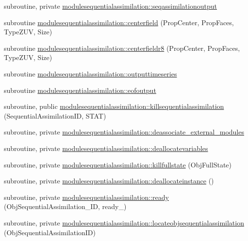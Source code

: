 \begin{DoxyCompactItemize}
subroutine, private \mbox{\hyperlink{namespacemodulesequentialassimilation_a80cfe86b207ec25cc26de13d8bad205c}{modulesequentialassimilation\+::seqassimilationoutput}}
\item 
subroutine \mbox{\hyperlink{namespacemodulesequentialassimilation_a2481d2ea20d9e305e0090e324dd3893e}{modulesequentialassimilation\+::centerfield}} (Prop\+Center, Prop\+Faces, Type\+Z\+UV, Size)
\item 
subroutine \mbox{\hyperlink{namespacemodulesequentialassimilation_aa1246853229add1c591a38826af67ea2}{modulesequentialassimilation\+::centerfieldr8}} (Prop\+Center, Prop\+Faces, Type\+Z\+UV, Size)
\item 
subroutine \mbox{\hyperlink{namespacemodulesequentialassimilation_a484eaebcabbe127119b8f5623e94c654}{modulesequentialassimilation\+::outputtimeseries}}
\item 
subroutine \mbox{\hyperlink{namespacemodulesequentialassimilation_a4f7834d6d8d5c26c37c74e758a14b521}{modulesequentialassimilation\+::eofoutput}}
\item 
subroutine, public \mbox{\hyperlink{namespacemodulesequentialassimilation_a50ed5db30b7f431f2b333f7f86d5ef99}{modulesequentialassimilation\+::killsequentialassimilation}} (Sequential\+Assimilation\+ID, S\+T\+AT)
\item 
subroutine, private \mbox{\hyperlink{namespacemodulesequentialassimilation_adf87f0a5e3f8680e6eab41ee6c53dd51}{modulesequentialassimilation\+::deassociate\+\_\+external\+\_\+modules}}
\item 
subroutine, private \mbox{\hyperlink{namespacemodulesequentialassimilation_aa604c23d9d9ee0bb814f499c565fde3f}{modulesequentialassimilation\+::deallocatevariables}}
\item 
subroutine, private \mbox{\hyperlink{namespacemodulesequentialassimilation_a7077ed60ddc61ad6d71f0df6d63bd587}{modulesequentialassimilation\+::killfullstate}} (Obj\+Full\+State)
\item 
subroutine, private \mbox{\hyperlink{namespacemodulesequentialassimilation_a3d80f83cfeb707312981be037f194082}{modulesequentialassimilation\+::deallocateinstance}} ()
\item 
subroutine, private \mbox{\hyperlink{namespacemodulesequentialassimilation_a612c7f8e7d5560ffd80850c43f9e9c35}{modulesequentialassimilation\+::ready}} (Obj\+Sequential\+Assimilation\+\_\+\+ID, ready\+\_\+)
\item 
subroutine, private \mbox{\hyperlink{namespacemodulesequentialassimilation_a1d6ec9ce245a5aa2d80e8f35b8142e21}{modulesequentialassimilation\+::locateobjsequentialassimilation}} (Obj\+Sequential\+Assimilation\+ID)
\end{DoxyCompactItemize}

